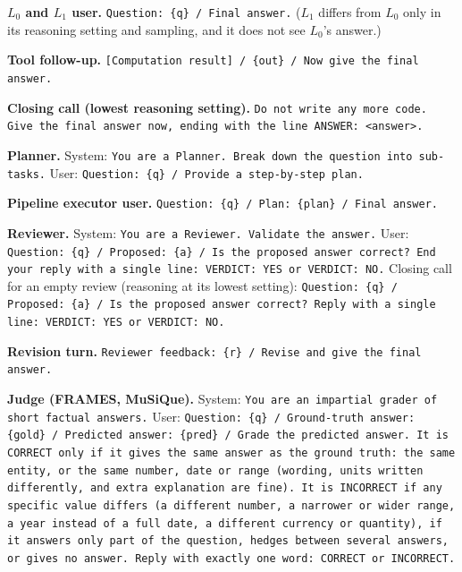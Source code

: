 \noindent\textbf{$L_0$ and $L_1$ user.} \texttt{Question: \{q\} / Final answer.} ($L_1$ differs from $L_0$
only in its reasoning setting and sampling, and it does not see $L_0$'s answer.)

\noindent\textbf{Tool follow-up.} \texttt{[Computation result] / \{out\} / Now give the final answer.}

\noindent\textbf{Closing call (lowest reasoning setting).} \texttt{Do not write any more code. Give the final answer now,
ending with the line ANSWER: <answer>.}

\noindent\textbf{Planner.} System: \texttt{You are a Planner. Break down the question into
sub-tasks.} User: \texttt{Question: \{q\} / Provide a step-by-step plan.}

\noindent\textbf{Pipeline executor user.} \texttt{Question: \{q\} / Plan: \{plan\} / Final answer.}

\noindent\textbf{Reviewer.} System: \texttt{You are a Reviewer. Validate the answer.} User:
\texttt{Question: \{q\} / Proposed: \{a\} / Is the proposed answer correct? End your reply with a single
line: VERDICT: YES or VERDICT: NO.} Closing call for an empty review (reasoning at its lowest setting):
\texttt{Question: \{q\} / Proposed: \{a\} / Is the proposed answer correct? Reply with a single line:
VERDICT: YES or VERDICT: NO.}

\noindent\textbf{Revision turn.} \texttt{Reviewer feedback: \{r\} / Revise and give the final answer.}

\noindent\textbf{Judge (FRAMES, MuSiQue).} System: \texttt{You are an impartial grader of short factual
answers.} User: \texttt{Question: \{q\} / Ground-truth answer: \{gold\} / Predicted answer: \{pred\} /
Grade the predicted answer. It is CORRECT only if it gives the same answer as the ground truth: the
same entity, or the same number, date or range (wording, units written differently, and extra
explanation are fine). It is INCORRECT if any specific value differs (a different number, a narrower
or wider range, a year instead of a full date, a different currency or quantity), if it answers only
part of the question, hedges between several answers, or gives no answer. Reply with exactly one
word: CORRECT or INCORRECT.}
